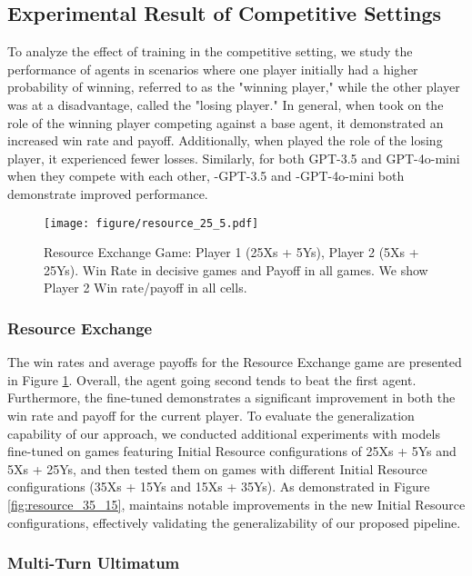 \subsection{Experimental Result of Competitive Settings}
To analyze the effect of training in the competitive setting, we study the performance of agents in scenarios where one player initially had a higher probability of winning, referred to as the "winning player," while the other player was at a disadvantage, called the "losing player." In general, when \model{} took on the role of the winning player competing against a base agent, it demonstrated an increased win rate and payoff. Additionally, when \model{} played the role of the losing player, it experienced fewer losses. Similarly, for both GPT-3.5 and GPT-4o-mini when they compete with each other, \model-GPT-3.5 and \model-GPT-4o-mini both demonstrate improved performance.


\begin{figure}[htbp]
    \centering
    \texttt{[image: figure/resource\_25\_5.pdf]}
    \caption{Resource Exchange Game: Player 1 (25Xs + 5Ys), Player 2 (5Xs + 25Ys). Win Rate in decisive games and Payoff in all games. We show Player 2 Win rate/payoff in all cells.}
    \label{fig:resource_25_5}
\end{figure}
\subsubsection{Resource Exchange} 
The win rates and average payoffs for the Resource Exchange game are presented in Figure \ref{fig:resource_25_5}. 
Overall, the agent going second tends to beat the first agent.  Furthermore, the fine-tuned \model{} demonstrates a significant improvement in both the win rate and payoff for the current player. To evaluate the generalization capability of our approach, we conducted additional experiments with models fine-tuned on games featuring Initial Resource configurations of 25Xs + 5Ys and 5Xs + 25Ys, and then tested them on games with different Initial Resource configurations (35Xs + 15Ys and 15Xs + 35Ys). As demonstrated in Figure \ref{fig:resource_35_15}, \model{} maintains notable improvements in the new Initial Resource configurations, effectively validating the generalizability of our proposed pipeline.



\subsubsection{Multi-Turn Ultimatum}

